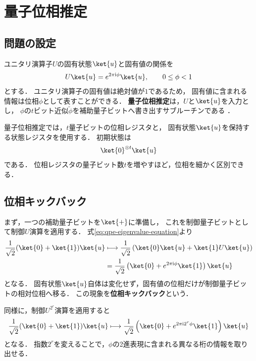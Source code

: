\section{量子位相推定}
\label{sec:quantum-phase-estimation}

\subsection{問題の設定}
\label{subsec:qpe-problem-setting}

ユニタリ演算子$U$の固有状態$\ket{u}$と固有値の関係を
\begin{equation}
  U\ket{u}
  =
  e^{2\pi\mathrm{i}\phi}\ket{u},
  \qquad
  0\leq\phi<1
  \label{eq:qpe-eigenvalue-equation}
\end{equation}
とする．
ユニタリ演算子の固有値は絶対値が$1$であるため，
固有値に含まれる情報は位相$\phi$として表すことができる．
\textbf{量子位相推定}は，$U$と$\ket{u}$を入力とし，
$\phi$の$t$ビット近似$\widetilde{\phi}$を補助量子ビットへ書き出すサブルーチンである
\cite{kitaev1995,shimada2020}．

量子位相推定では，$t$量子ビットの位相レジスタと，
固有状態$\ket{u}$を保持する状態レジスタを使用する．
初期状態は
\begin{align*}
  \ket{0}^{\otimes t}\ket{u}
\end{align*}
である．
位相レジスタの量子ビット数$t$を増やすほど，位相を細かく区別できる．

\subsection{位相キックバック}
\label{subsec:qpe-phase-kickback}

まず，一つの補助量子ビットを$\ket{+}$に準備し，
これを制御量子ビットとして制御$U$演算を適用する．
式\eqref{eq:qpe-eigenvalue-equation}より
\begin{align}
  \frac{1}{\sqrt{2}}
  (\ket{0}+\ket{1})\ket{u}
  &\longmapsto
  \frac{1}{\sqrt{2}}
  \left(
    \ket{0}\ket{u}
    +\ket{1}U\ket{u}
  \right)\notag\\
  &=
  \frac{1}{\sqrt{2}}
  \left(
    \ket{0}
    +e^{2\pi\mathrm{i}\phi}\ket{1}
  \right)\ket{u}
  \label{eq:single-qubit-phase-kickback}
\end{align}
となる．
固有状態$\ket{u}$自体は変化せず，固有値の位相だけが制御量子ビットの相対位相へ移る．
この現象を\textbf{位相キックバック}という．

同様に，制御$U^{2^r}$演算を適用すると
\begin{align*}
  \frac{1}{\sqrt{2}}(\ket{0}+\ket{1})\ket{u}
  \longmapsto
  \frac{1}{\sqrt{2}}
  \left(
    \ket{0}+e^{2\pi\mathrm{i}2^r\phi}\ket{1}
  \right)\ket{u}
\end{align*}
となる．
指数$2^r$を変えることで，$\phi$の2進表現に含まれる異なる桁の情報を取り出せる．

